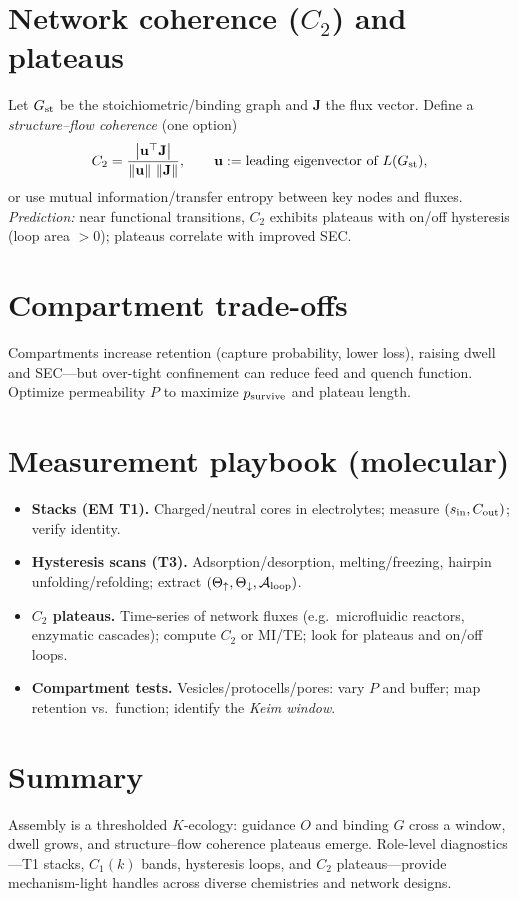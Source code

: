\documentclass[12pt,a4paper,oneside]{scrreprt}
\begin{document}
\section{Network coherence ($C_2$) and plateaus}\label{sec:network-coherence}
Let $G_{\rm st}$ be the stoichiometric/binding graph and $\mathbf J$ the flux vector. Define a \emph{structure–flow coherence} (one option)
\[
C_2=\frac{\left|\mathbf u^\top \mathbf J\right|}{\|\mathbf u\|\ \|\mathbf J\|},\qquad 
\mathbf u:=\text{leading eigenvector of }L(G_{\rm st}),
\]
or use mutual information/transfer entropy between key nodes and fluxes. \emph{Prediction:} near functional transitions, $C_2$ exhibits plateaus with on/off hysteresis (loop area $>0$); plateaus correlate with improved SEC.

\section{Compartment trade-offs}\label{sec:compartments}
Compartments increase retention (capture probability, lower loss), raising dwell and SEC—but over-tight confinement can reduce feed and quench function. Optimize permeability $P$ to maximize $p_{\rm survive}$ and plateau length.

\section{Measurement playbook (molecular)}\label{sec:molecular-playbook}
\begin{itemize}
\item \textbf{Stacks (EM T1).} Charged/neutral cores in electrolytes; measure $(s_{\rm in}, C_{\rm out})$; verify identity.
\item \textbf{Hysteresis scans (T3).} Adsorption/desorption, melting/freezing, hairpin unfolding/refolding; extract $(\Theta_\uparrow,\Theta_\downarrow,\mathcal A_{\rm loop})$.
\item \textbf{$C_2$ plateaus.} Time-series of network fluxes (e.g.\ microfluidic reactors, enzymatic cascades); compute $C_2$ or MI/TE; look for plateaus and on/off loops.
\item \textbf{Compartment tests.} Vesicles/protocells/pores: vary $P$ and buffer; map retention vs.\ function; identify the \emph{Keim window}.
\end{itemize}

\section*{Summary}
Assembly is a thresholded $K$-ecology: guidance $O$ and binding $G$ cross a window, dwell grows, and structure–flow coherence plateaus emerge. Role-level diagnostics—T1 stacks, $C_1(k)$ bands, hysteresis loops, and $C_2$ plateaus—provide mechanism-light handles across diverse chemistries and network designs.
\end{document}
